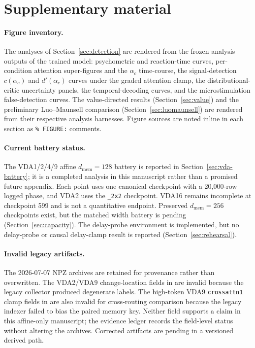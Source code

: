 \appendix
\section{Supplementary material}
\label{sec:appendix}

\paragraph{Figure inventory.} The analyses of Section~\ref{sec:detection} are rendered
from the frozen analysis outputs of the trained model: psychometric and reaction-time
curves, per-condition attention super-figures and the $\alpha_c$ time-course, the
signal-detection $c(\alpha_c)$ and $d'(\alpha_c)$ curves under the graded attention
clamp, the distributional-critic uncertainty panels, the temporal-decoding curves, and
the microstimulation false-detection curves. The value-directed results
(Section~\ref{sec:value}) and the preliminary Luo--Maunsell comparison
(Section~\ref{sec:luomaunsell}) are rendered from their respective analysis harnesses.
Figure sources are noted inline in each section as \texttt{\% FIGURE:} comments.

\paragraph{Current battery status.} The VDA1/2/4/9 affine $d_{\mathrm{mem}}=128$
battery is reported in Section~\ref{sec:vda-battery}; it is a completed analysis in
this manuscript rather than a promised future appendix.
Each point uses one canonical checkpoint with a 20{,}000-row logged phase, and VDA2
uses the \texttt{\_2x2} checkpoint. VDA16 remains incomplete at checkpoint 599 and is
not a quantitative endpoint. Preserved $d_{\mathrm{mem}}=256$ checkpoints exist, but
the matched width battery is pending (Section~\ref{sec:capacity}). The delay-probe
environment is implemented, but no delay-probe or causal delay-clamp result is reported
(Section~\ref{sec:rehearsal}).

\paragraph{Invalid legacy artifacts.} The 2026-07-07 NPZ archives are retained for
provenance rather than overwritten. The VDA2/VDA9 change-location fields in
 are invalid because the legacy collector produced
degenerate labels. The high-token VDA9 \texttt{crossattn1} clamp fields in
 are also invalid for cross-routing comparison because
the legacy indexer failed to bias the paired memory key. Neither field supports a
claim in this affine-only manuscript; the evidence ledger records the field-level
status without altering the archives. Corrected artifacts are pending in a versioned
derived path.


